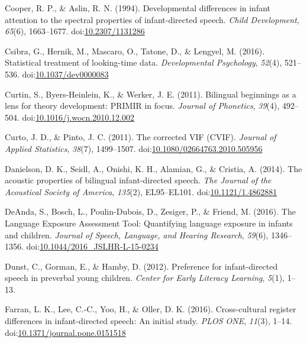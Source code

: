 \documentclass[,man,floatsintext]{apa6}
\begin{document}
\leavevmode\hypertarget{ref-cooper_1994}{}%
Cooper, R. P., \& Aslin, R. N. (1994). Developmental differences in infant attention to the spectral properties of infant-directed speech. \emph{Child Development}, \emph{65}(6), 1663--1677. doi:\href{https://doi.org/10.2307/1131286}{10.2307/1131286}

\leavevmode\hypertarget{ref-csibra_2016}{}%
Csibra, G., Hernik, M., Mascaro, O., Tatone, D., \& Lengyel, M. (2016). Statistical treatment of looking-time data. \emph{Developmental Psychology}, \emph{52}(4), 521--536. doi:\href{https://doi.org/10.1037/dev0000083}{10.1037/dev0000083}

\leavevmode\hypertarget{ref-curtin_2011}{}%
Curtin, S., Byers-Heinlein, K., \& Werker, J. E. (2011). Bilingual beginnings as a lens for theory development: PRIMIR in focus. \emph{Journal of Phonetics}, \emph{39}(4), 492--504. doi:\href{https://doi.org/10.1016/j.wocn.2010.12.002}{10.1016/j.wocn.2010.12.002}

\leavevmode\hypertarget{ref-curto_2011}{}%
Curto, J. D., \& Pinto, J. C. (2011). The corrected VIF (CVIF). \emph{Journal of Applied Statistics}, \emph{38}(7), 1499--1507. doi:\href{https://doi.org/10.1080/02664763.2010.505956}{10.1080/02664763.2010.505956}

\leavevmode\hypertarget{ref-danielson_2014}{}%
Danielson, D. K., Seidl, A., Onishi, K. H., Alamian, G., \& Cristia, A. (2014). The acoustic properties of bilingual infant-directed speech. \emph{The Journal of the Acoustical Society of America}, \emph{135}(2), EL95--EL101. doi:\href{https://doi.org/10.1121/1.4862881}{10.1121/1.4862881}

\leavevmode\hypertarget{ref-deanda_2016}{}%
DeAnda, S., Bosch, L., Poulin-Dubois, D., Zesiger, P., \& Friend, M. (2016). The Language Exposure Assessment Tool: Quantifying language exposure in infants and children. \emph{Journal of Speech, Language, and Hearing Research}, \emph{59}(6), 1346--1356. doi:\href{https://doi.org/10.1044/2016_JSLHR-L-15-0234}{10.1044/2016\_JSLHR-L-15-0234}

\leavevmode\hypertarget{ref-dunst_2012}{}%
Dunst, C., Gorman, E., \& Hamby, D. (2012). Preference for infant-directed speech in preverbal young children. \emph{Center for Early Literacy Learning}, \emph{5}(1), 1--13.

\leavevmode\hypertarget{ref-farran_2016}{}%
Farran, L. K., Lee, C.-C., Yoo, H., \& Oller, D. K. (2016). Cross-cultural register differences in infant-directed speech: An initial study. \emph{PLOS ONE}, \emph{11}(3), 1--14. doi:\href{https://doi.org/10.1371/journal.pone.0151518}{10.1371/journal.pone.0151518}
\end{document}
